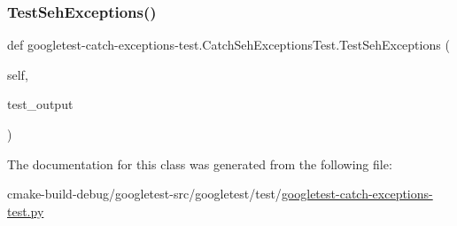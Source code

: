 \mbox{\label{classgoogletest-catch-exceptions-test_1_1CatchSehExceptionsTest_a86d5639a464b9ee5e05816758bd1ae1f}} 
\subsubsection{\texorpdfstring{TestSehExceptions()}{TestSehExceptions()}}
{\footnotesize\ttfamily def googletest-\/catch-\/exceptions-\/test.\+Catch\+Seh\+Exceptions\+Test.\+Test\+Seh\+Exceptions (\begin{DoxyParamCaption}\item[{}]{self,  }\item[{}]{test\+\_\+output }\end{DoxyParamCaption})}



The documentation for this class was generated from the following file\+:\begin{DoxyCompactItemize}
\item 
cmake-\/build-\/debug/googletest-\/src/googletest/test/\mbox{\hyperlink{googletest-catch-exceptions-test_8py}{googletest-\/catch-\/exceptions-\/test.\+py}}\end{DoxyCompactItemize}

